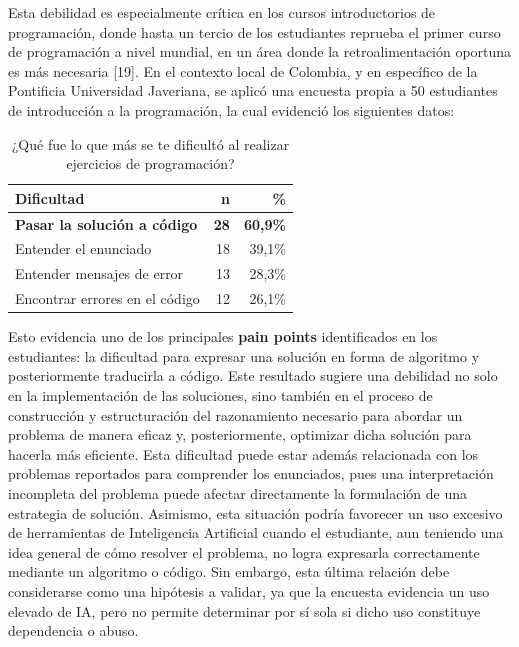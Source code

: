 \documentclass[letterpaper, 10 pt, conference]{ieeeconf}
\begin{document}
    Esta debilidad es especialmente crítica en los cursos introductorios de programación, donde hasta un tercio de los estudiantes reprueba el primer curso de programación a nivel mundial, en un área donde la retroalimentación oportuna es más necesaria [19]. En el contexto local de Colombia, y en específico de la Pontificia Universidad Javeriana, se aplicó una encuesta propia a 50 estudiantes de introducción a la programación, la cual evidenció los siguientes datos:
        
    \begin{table}[ht]
    \centering
    \caption{¿Qué fue lo que más se te dificultó al realizar ejercicios de programación?}
    \label{tab:feedback}
    \begin{tabular}{lrr}
    \hline
    \textbf{Dificultad} & \textbf{n} & \textbf{\%} \\
    \hline
    \textbf{Pasar la solución a código} & \textbf{28} & \textbf{60,9\%} \\
    Entender el enunciado & 18 & 39,1\% \\
    Entender mensajes de error & 13 & 28,3\% \\
    Encontrar errores en el código & 12 & 26,1\% \\
    \hline
    \end{tabular}
    \end{table}

    Esto evidencia uno de los principales \textbf{pain points} identificados en los estudiantes: la dificultad para expresar una solución en forma de algoritmo y posteriormente traducirla a código. Este resultado sugiere una debilidad no solo en la implementación de las soluciones, sino también en el proceso de construcción y estructuración del razonamiento necesario para abordar un problema de manera eficaz y, posteriormente, optimizar dicha solución para hacerla más eficiente. Esta dificultad puede estar además relacionada con los problemas reportados para comprender los enunciados, pues una interpretación incompleta del problema puede afectar directamente la formulación de una estrategia de solución. Asimismo, esta situación podría favorecer un uso excesivo de herramientas de Inteligencia Artificial cuando el estudiante, aun teniendo una idea general de cómo resolver el problema, no logra expresarla correctamente mediante un algoritmo o código. Sin embargo, esta última relación debe considerarse como una hipótesis a validar, ya que la encuesta evidencia un uso elevado de IA, pero no permite determinar por sí sola si dicho uso constituye dependencia o abuso.
\end{document}
